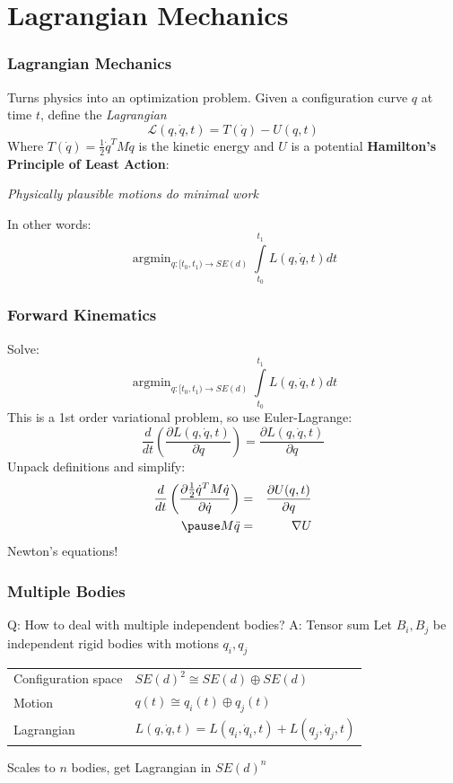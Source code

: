 \documentclass{beamer}
\begin{document}
\section{Lagrangian Mechanics}
\begin{frame}
\frametitle{Lagrangian Mechanics}
Turns physics into an optimization problem.
\vskip5pt
\pause
Given a configuration curve $q$ at time $t$, define the \emph{Lagrangian}
\[ \mathcal{L}(q, \dot{q}, t) = T(\dot{q}) - U(q, t) \]
Where $T(\dot{q}) = \frac{1}{2} \dot{q}^T M \dot{q}$ is the kinetic energy and $U$ is a potential
\vskip15pt
\pause
{\bf Hamilton's Principle of Least Action}:
\begin{center}
	\emph{Physically plausible motions do minimal work}
\end{center}
\vskip10pt
\pause
In other words:
\[ \mathop{\text{argmin}}_{q : [t_0, t_1) \to SE(d)} \int \limits_{t_0}^{t_1} L(q, \dot{q}, t) dt \]
\end{frame}

\begin{frame}
\frametitle{Forward Kinematics}
Solve:
\[ \mathop{\text{argmin}}_{q : [t_0, t_1) \to SE(d)} \int \limits_{t_0}^{t_1} L(q, \dot{q}, t) dt \]
\pause
This is a 1st order variational problem, so use Euler-Lagrange:
\[ \frac{d}{dt} \left ( \frac{\partial L(q, \dot{q}, t)}{\partial \dot{q}} \right) = \frac{\partial L(q, \dot{q}, t)}{\partial q} \]
\pause
Unpack definitions and simplify:
\begin{eqnarray*}
\frac{d}{dt} \left( \frac{\partial \frac{1}{2} \dot{q}^T M \dot{q} }{\partial \dot{q}} \right) & = & \frac{\partial U(q, t)}{\partial q} \\
\pause
M \ddot{q} & = & \nabla U
\end{eqnarray*}
Newton's equations!
\end{frame}

\begin{frame}
\frametitle{Multiple Bodies}
Q: How to deal with multiple independent bodies?
\pause
\vskip5pt
A: Tensor sum
\vskip15pt
Let $B_i, B_j$ be independent rigid bodies with motions $q_i, q_j$
\vskip15pt
\begin{tabular}{ll}
Configuration space & $SE(d)^2 \cong SE(d) \oplus SE(d)$ \\
Motion & $q(t) \cong q_i(t) \oplus q_j(t)$ \\
Lagrangian & $L(q,\dot{q},t) = L(q_i, \dot{q}_i, t) + L(q_j, \dot{q}_j, t)$ \\
\end{tabular}
\pause
\vskip15pt
Scales to $n$ bodies, get Lagrangian in $SE(d)^n$
\end{frame}
\end{document}
